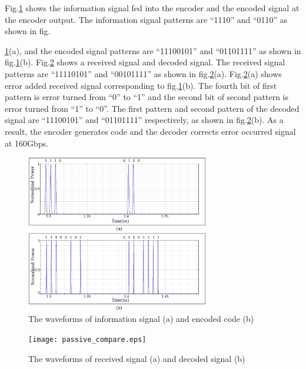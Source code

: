 \documentclass[twocolumn,a4paper]{article}
\begin{document}
Fig.{\ref{figure:send_compare}} shows the information signal fed into the encoder and the encoded signal at the encoder output. The information signal patterns are ``1110'' and ``0110'' as shown in fig.{\ref{figure:send_compare}(a), and the encoded signal patterns are ``11100101'' and ``01101111'' as shown in fig.{\ref{figure:send_compare}}(b). Fig.{\ref{figure:passive_compare}} shows a received signal and decoded signal. The received signal patterns are ``11110101'' and ``00101111'' as shown in fig.{\ref{figure:passive_compare}}(a). Fig.{\ref{figure:passive_compare}}(a) shows error added received signal corresponding to fig.{\ref{figure:send_compare}}(b). The fourth bit of first pattern is error turned from ``0'' to ``1'' and the second bit of second pattern is error turned from ``1'' to ``0''. The first pattern and second pattern of the decoded signal are ``11100101'' and ``01101111'' respectively, as shown in fig.{\ref{figure:passive_compare}}(b). As a result, the encoder generates code and the decoder corrects error occurred signal at 160Gbps.

\begin{figure}[htbp]
\begin{center}
  \includegraphics[width=80mm]{send_compare.eps}
  \caption{The waveforms of information signal (a) and encoded code (b) }
  \label{figure:send_compare}
\end{center}
\end{figure}

\begin{figure}[htbp]
\begin{center}
  \texttt{[image: passive\_compare.eps]}
  \caption{The waveforms of received signal (a) and decoded signal (b) }
  \label{figure:passive_compare}
\end{center}
\end{figure}

\newpage

}
\end{document}
